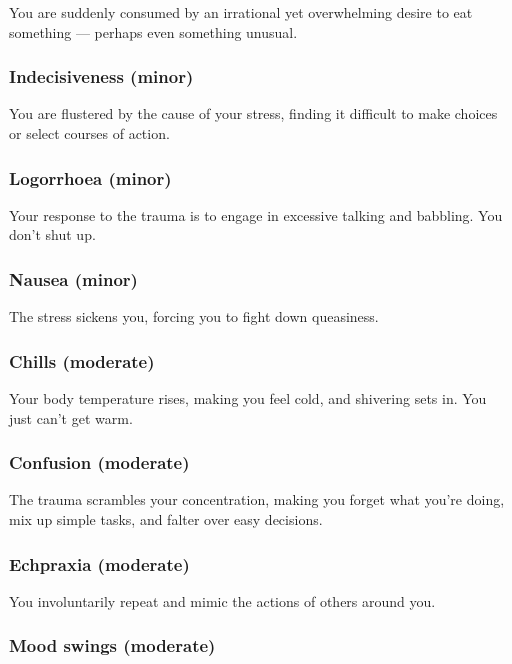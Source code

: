 You are suddenly consumed by an irrational yet overwhelming desire to eat something --- perhaps even something unusual.

\subsubsection{Indecisiveness (minor)}

You are flustered by the cause of your stress, finding it difficult to make choices or select courses of action.

\subsubsection{Logorrhoea (minor)}

Your response to the trauma is to engage in excessive talking and babbling. You don’t shut up.

\subsubsection{Nausea (minor)}

The stress sickens you, forcing you to fight down queasiness.

\subsubsection{Chills (moderate)}

Your body temperature rises, making you feel cold, and shivering sets in. You just can’t get warm.

\subsubsection{Confusion (moderate)}

The trauma scrambles your concentration, making you forget what you’re doing, mix up simple tasks, and falter over easy decisions.

\subsubsection{Echpraxia (moderate)}

You involuntarily repeat and mimic the actions of others around you.

\subsubsection{Mood swings (moderate)}

